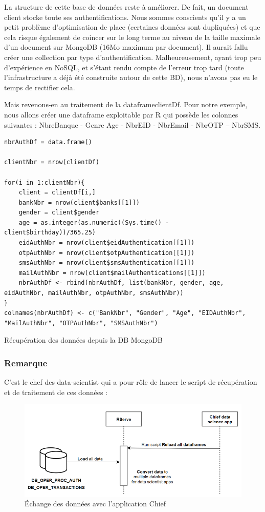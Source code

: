 La structure de cette base de données reste à améliorer. De fait, un document client stocke toute ses
authentifications. Nous sommes conscients qu'il y a un petit problème d'optimisation de place
(certaines données sont dupliquées) et que cela risque également de coincer sur le long terme au
niveau de la taille maximale d'un document sur MongoDB (16Mo maximum par document). Il aurait
fallu créer une collection par type d'authentification. Malheureusement, ayant trop peu d'expérience
en NoSQL, et s'étant rendu compte de l'erreur trop tard (toute l'infrastructure a déjà été construite
autour de cette BD), nous n'avons pas eu le temps de rectifier cela.

Mais revenons-en au traitement de la dataframeclientDf. Pour notre exemple, nous allons créer une
dataframe exploitable par R qui possède les colonnes suivantes : NbreBanque - Genre Age - NbrEID -
NbrEmail - NbrOTP – NbrSMS.

\begin{listing}[H]
    \begin{verbatim}
nbrAuthDf = data.frame()

clientNbr = nrow(clientDf)

for(i in 1:clientNbr){
    client = clientDf[i,]
    bankNbr = nrow(client$banks[[1]])
    gender = client$gender
    age = as.integer(as.numeric((Sys.time() - client$birthday))/365.25)
    eidAuthNbr = nrow(client$eidAuthentication[[1]])
    otpAuthNbr = nrow(client$otpAuthentication[[1]])
    smsAuthNbr = nrow(client$smsAuthentication[[1]])
    mailAuthNbr = nrow(client$mailAuthentications[[1]])
    nbrAuthDf <- rbind(nbrAuthDf, list(bankNbr, gender, age, eidAuthNbr, mailAuthNbr, otpAuthNbr, smsAuthNbr))
}
colnames(nbrAuthDf) <- c("BankNbr", "Gender", "Age", "EIDAuthNbr", "MailAuthNbr", "OTPAuthNbr", "SMSAuthNbr")
    \end{verbatim}
    \caption{Récupération des données depuis la DB MongoDB}
    \label{listing:thibault-r-code}
\end{listing}

\subsubsection{Remarque}

C'est le chef des data-scientist qui a pour rôle de lancer le script de récupération et de traitement de ces données :

\begin{figure}[H]
    \centering
    \includegraphics[width=\textwidth]{./img/thibault-Serveur_RServe.png}
    \caption{Échange des données avec l'application Chief}
    \label{fig:thibault-server-rserve}
\end{figure}

